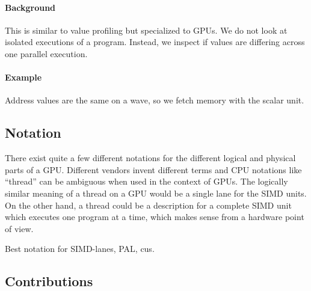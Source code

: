 \paragraph{Background} This is similar to value profiling but specialized to GPUs. We do not look at isolated executions of a program. Instead, we inspect if values are differing across one parallel execution.
\paragraph{Example} Address values are the same on a wave, so we fetch memory with the scalar unit.

\subsection{Notation}
\label{sub:notation}
There exist quite a few different notations for the different logical and physical parts of a GPU. Different vendors invent different terms and CPU notations like \enquote{thread} can be ambiguous when used in the context of GPUs. The logically similar meaning of a thread on a GPU would be a single lane for the SIMD units. On the other hand, a thread could be a description for a complete SIMD unit which executes one program at a time, which makes sense from a hardware point of view.



Best notation for SIMD-lanes, PAL, \glspl{cu}.

\subsection{Contributions}
\label{sub:contributions}
